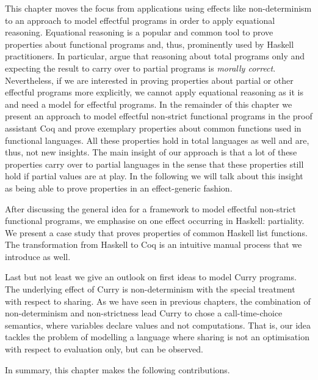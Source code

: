 
This chapter moves the focus from applications using effects like
non-determinism to an approach to model effectful programs in order to
apply equational reasoning.
Equational reasoning is a popular and common tool to prove properties
about functional programs and, thus, prominently used by Haskell
practitioners. 
In particular, \citet{danielsson2006fast} argue that reasoning about
total programs only and expecting the result to carry over to partial
programs is \textit{morally correct}.
Nevertheless, if we are interested in proving properties about partial
or other effectful programs more explicitly, we cannot apply
equational reasoning as it is and need a model for effectful programs.
In the remainder of this chapter we present an approach to model
effectful non-strict functional programs in the proof assistant Coq
and prove exemplary properties about common functions used in
functional languages.
All these properties hold in total languages as well and are, thus,
not new insights.
The main insight of our approach is that a lot of these properties
carry over to partial languages in the sense that these properties
still hold if partial values are at play.
In the following we will talk about this insight as being able to
prove properties in an effect-generic fashion.

After discussing the general idea for a framework to model effectful
non-strict functional programs, we emphasise on one effect occurring
in Haskell: partiality.
We present a case study that proves properties of common Haskell list
functions.
The transformation from Haskell to Coq is an intuitive manual
process that we introduce as well.

Last but not least we give an outlook on first ideas to model Curry
programs.
The underlying effect of Curry is non-determinism with the special
treatment with respect to sharing.
As we have seen in previous chapters, the combination of
non-determinism and non-strictness lead Curry to chose a
call-time-choice semantics, where variables declare values and not computations.
That is, our idea tackles the problem of modelling a language where
sharing is not an optimisation with respect to evaluation only, but
can be observed.

In summary, this chapter makes the following contributions.

